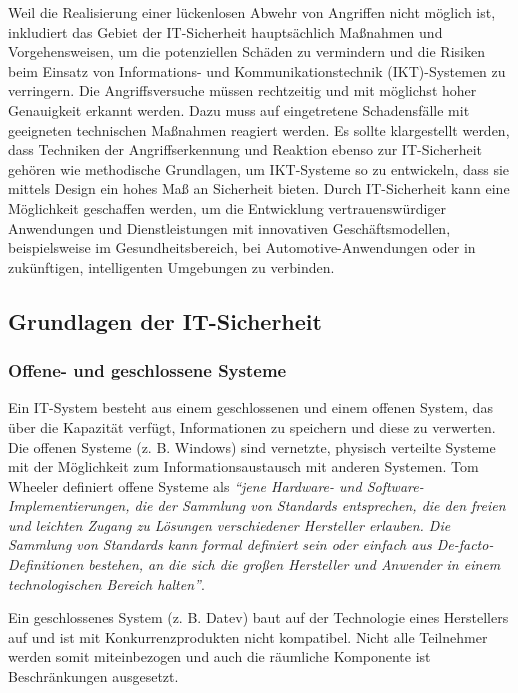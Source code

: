 Weil die Realisierung einer lückenlosen Abwehr von Angriffen nicht möglich ist, inkludiert das Gebiet der IT-Sicherheit hauptsächlich Maßnahmen und Vorgehensweisen, um die potenziellen Schäden zu vermindern und die Risiken beim Einsatz von Informations- und Kommunikationstechnik (IKT)-Systemen zu verringern. Die Angriffsversuche müssen rechtzeitig und mit möglichst hoher Genauigkeit erkannt werden. Dazu muss auf eingetretene Schadensfälle mit geeigneten technischen Maßnahmen reagiert werden. Es sollte klargestellt werden, dass Techniken der Angriffserkennung und Reaktion ebenso zur IT-Sicherheit gehören wie methodische Grundlagen, um IKT-Systeme so zu entwickeln, dass sie mittels Design ein hohes Maß an Sicherheit bieten. Durch IT-Sicherheit kann eine Möglichkeit geschaffen werden, um die Entwicklung vertrauenswürdiger Anwendungen und Dienstleistungen mit innovativen Geschäftsmodellen, beispielsweise im Gesundheitsbereich, bei Automotive-Anwendungen oder in zukünftigen, intelligenten Umgebungen zu verbinden\cite[20--21]{eckert2013sicherheit}.

\subsection{Grundlagen der IT-Sicherheit}

\subsubsection{Offene- und geschlossene Systeme}

Ein IT-System besteht aus einem geschlossenen und einem offenen System, das über die Kapazität verfügt, Informationen zu speichern und diese zu verwerten. Die offenen Systeme (z. B. Windows) sind vernetzte, physisch verteilte Systeme mit der Möglichkeit zum Informationsaustausch mit anderen Systemen\cite[22--23]{eckert2013sicherheit}. Tom Wheeler definiert offene Systeme als \emph{"`jene Hardware- und Software-Implementierungen, die der Sammlung von Standards entsprechen, die den freien und leichten Zugang zu Lösungen verschiedener Hersteller erlauben. Die Sammlung von Standards kann formal definiert sein oder einfach aus De-facto-Definitionen bestehen, an die sich die großen Hersteller und Anwender in einem technologischen Bereich halten"'}\cite[4]{wheeler2013offene}. 

Ein geschlossenes System (z. B. Datev) baut auf der Technologie eines Herstellers auf und ist mit Konkurrenzprodukten nicht kompatibel. Nicht alle Teilnehmer werden somit miteinbezogen und auch die räumliche Komponente ist Beschränkungen ausgesetzt\cite[22--23]{eckert2013sicherheit}.

